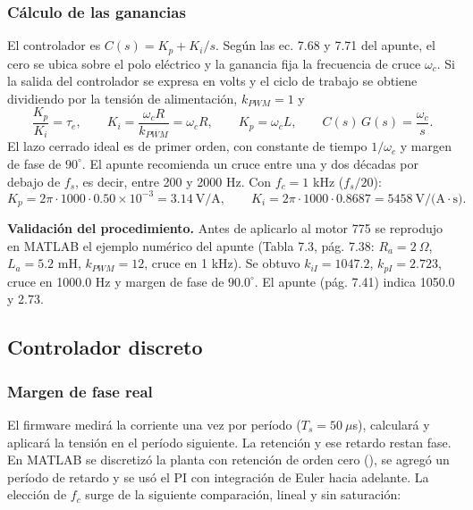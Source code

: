 \subsubsection{Cálculo de las ganancias}
El controlador es $C(s) = K_p + K_i/s$. Según las ec. 7.68 y 7.71 del apunte, el cero se ubica sobre el polo eléctrico y la ganancia fija la frecuencia de cruce $\omega_c$. Si la salida del controlador se expresa en volts y el ciclo de trabajo se obtiene dividiendo por la tensión de alimentación, $k_{PWM} = 1$ y
\begin{equation}
\frac{K_p}{K_i} = \tau_e,\qquad K_i = \frac{\omega_c R}{k_{PWM}} = \omega_c R,\qquad K_p = \omega_c L,\qquad C(s)\,G(s) = \frac{\omega_c}{s}.
\label{eq:cc_ganancias}
\end{equation}
El lazo cerrado ideal es de primer orden, con constante de tiempo $1/\omega_c$ y margen de fase de $90^\circ$. El apunte recomienda un cruce entre una y dos décadas por debajo de $f_s$, es decir, entre 200 y 2000 Hz. Con $f_c = 1$ kHz ($f_s/20$):
\[
K_p = 2\pi\cdot1000\cdot0.50\times10^{-3} = 3.14\ \text{V/A},\qquad
K_i = 2\pi\cdot1000\cdot0.8687 = 5458\ \text{V/(A}\cdot\text{s)}.
\]

\textbf{Validación del procedimiento.} Antes de aplicarlo al motor 775 se reprodujo en MATLAB el ejemplo numérico del apunte (Tabla 7.3, pág. 7.38: $R_a = 2\ \Omega$, $L_a = 5.2$ mH, $k_{PWM} = 12$, cruce en 1 kHz). Se obtuvo $k_{iI} = 1047.2$, $k_{pI} = 2.723$, cruce en 1000.0 Hz y margen de fase de $90.0^\circ$. El apunte (pág. 7.41) indica 1050.0 y 2.73.

\subsection{Controlador discreto}
\label{sec:cc_discreto}
\subsubsection{Margen de fase real}
El firmware medirá la corriente una vez por período ($T_s = 50\ \mu$s), calculará y aplicará la tensión en el período siguiente. La retención y ese retardo restan fase. En MATLAB se discretizó la planta con retención de orden cero (), se agregó un período de retardo y se usó el PI con integración de Euler hacia adelante. La elección de $f_c$ surge de la siguiente comparación, lineal y sin saturación:

